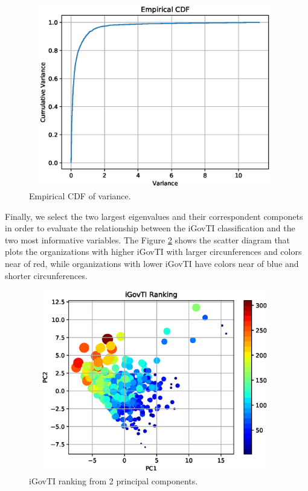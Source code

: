 \begin{figure}[h!]
     \centering 
     \includegraphics[height=8cm, width=11cm]{figures/ch2/raw_variance_ecdf.eps}
     \caption{Empirical CDF of variance.}
     \label{fig:ch2_fig2}
\end{figure}
 
Finally, we select the two largest eigenvalues and their correspondent componets in order to evaluate the relationship between the iGovTI classification and the two most informative variables. The Figure \ref{fig:ch2_fig3} shows the scatter diagram that plots the organizations with higher iGovTI with larger circunferences and colors near of red, while organizations with lower iGovTI have colors near of blue and shorter circunferences.
 
\begin{figure}[h!]
     \centering 
     \includegraphics[height=8cm, width=11cm]{figures/ch2/raw_igovti_ranking_pc2.eps}
     \caption{iGovTI ranking from 2 principal components.}
     \label{fig:ch2_fig3}
\end{figure}

